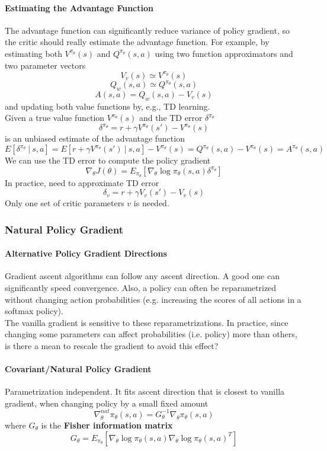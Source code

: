 \documentclass[10pt]{report}
\begin{document}
\paragraph{Estimating the Advantage Function} The advantage function can significantly reduce variance of policy gradient, so the critic should really estimate the advantage function. For example, by estimating both $V^{\pi_\theta}(s)$ and $Q^{\pi_\theta}(s,a)$ using two function approximators and two parameter vectors
$$V_v(s)\simeq V^{\pi_\theta}(s)$$
$$Q_w(s,a)\simeq Q^{\pi_\theta}(s,a)$$
$$A(s,a) = Q_w(s,a)-V_v(s)$$
and updating both value functions by, e.g., TD learning.\\
Given a true value function $V^{\pi_\theta}(s)$ and the TD error $\delta^{\pi_\theta}$ $$\delta^{\pi_\theta} = r+\gamma V^{\pi_\theta}(s')-V^{\pi_\theta}(s)$$
is an unbiased estimate of the advantage function
$$E[\delta^{\pi_\theta}\:|\:s,a]=E[r+\gamma V^{\pi_\theta}(s')\:|\:s,a]-V^{\pi_\theta}(s) = Q^{\pi_\theta}(s,a)-V^{\pi_\theta}(s) = A^{\pi_\theta}(s,a)$$
We can use the TD error to compute the policy gradient
$$\nabla_\theta J(\theta) = E_{\pi_\theta}[\nabla_\theta\log\pi_\theta(s,a)\delta^{\pi_\theta}]$$
In practice, need to approximate TD error
$$\delta_v = r+\gamma V_v(s')-V_v(s)$$
Only one set of critic parameters $v$ is needed.
\pagebreak
\subsubsection{Natural Policy Gradient}
\paragraph{Alternative Policy Gradient Directions} Gradient ascent algorithms can follow any ascent direction. A good one can significantly speed convergence. Also, a policy can often be reparametrized without changing action probabilities (e.g. increasing the scores of all actions in a softmax policy).\\
The vanilla gradient is sensitive to these reparametrizations. In practice, since changing some parameters can affect probabilities (i.e. policy) more than others, is there a mean to rescale the gradient to avoid this effect?
\paragraph{Covariant/Natural Policy Gradient} Parametrization independent. It fits ascent direction that is closest to vanilla gradient, when changing policy by a small fixed amount
$$\nabla_\theta^{nat}\pi_\theta(s,a) = G_\theta^{-1}\nabla_\theta\pi_\theta(s,a)$$
where $G_\theta$ is the \textbf{Fisher information matrix} $$G_\theta = E_{\pi_\theta}[\nabla_\theta\log\pi_\theta(s,a)\nabla_\theta\log\pi_\theta (s,a)^T]$$
\end{document}
